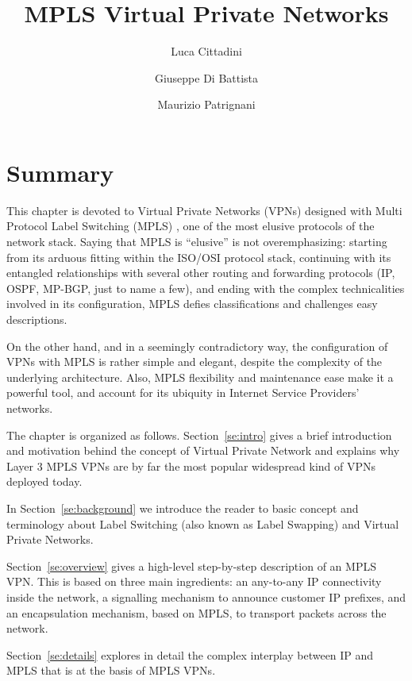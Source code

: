 \documentclass{article}
\begin{document}
\title{MPLS Virtual Private Networks}

\author{Luca Cittadini \and Giuseppe Di Battista \and Maurizio Patrignani}

\date{}

\maketitle

\section*{Summary}
This chapter is devoted to Virtual Private Networks (VPNs) designed with Multi 
Protocol Label Switching (MPLS) \cite{rfc4364,rfc3031,rfc5036}, one of the most 
elusive protocols of the network stack. Saying that MPLS is ``elusive'' is not 
overemphasizing: starting from its arduous fitting within the ISO/OSI protocol 
stack, continuing with its entangled relationships with several other routing 
and forwarding protocols (IP, OSPF, MP-BGP, just to name a few), and ending with 
the complex technicalities involved in its configuration, MPLS defies 
classifications and challenges easy descriptions. 

On the other hand, and in a seemingly contradictory way, the configuration of 
VPNs with MPLS is rather simple and elegant, despite the complexity of the 
underlying architecture. Also, MPLS flexibility and maintenance ease 
make it a powerful tool, and account for its ubiquity in Internet Service 
Providers' networks.

The chapter is organized as follows. Section~\ref{se:intro} gives a brief introduction and
motivation behind the concept of Virtual Private Network and explains why Layer 3 MPLS VPNs
are by far the most popular widespread kind of VPNs deployed today.

In Section~\ref{se:background} we introduce the reader to basic concept and terminology
about Label Switching (also known as Label Swapping) and Virtual Private Networks.

Section~\ref{se:overview} gives a high-level step-by-step description of an MPLS VPN. This is based on three main ingredients: an any-to-any IP connectivity inside the
network, a signalling mechanism to announce customer IP prefixes, and an encapsulation
mechanism, based on MPLS, to transport packets across the network.

Section~\ref{se:details} explores in detail the complex interplay between IP and MPLS that
is at the basis of MPLS VPNs.
\end{document}
